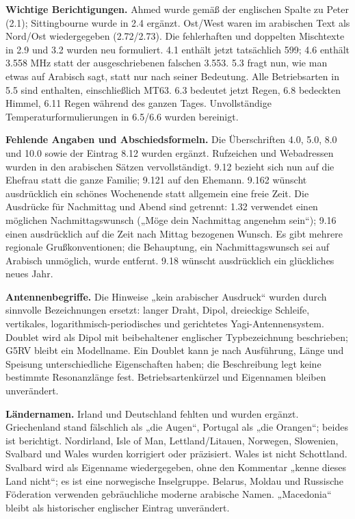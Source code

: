 \documentclass[a4paper,landscape,10pt]{article}
\begin{document}
\smallskip
\textbf{Wichtige Berichtigungen.} Ahmed wurde gemäß der englischen Spalte zu Peter (2.1);
Sittingbourne wurde in 2.4 ergänzt. Ost/West waren im arabischen Text als Nord/Ost wiedergegeben (2.72/2.73).
Die fehlerhaften und doppelten Mischtexte in 2.9 und 3.2 wurden neu formuliert.
4.1 enthält jetzt tatsächlich 599; 4.6 enthält 3.558 MHz statt der ausgeschriebenen falschen 3.553.
5.3 fragt nun, wie man etwas auf Arabisch sagt, statt nur nach seiner Bedeutung.
Alle Betriebsarten in 5.5 sind enthalten, einschließlich MT63.
6.3 bedeutet jetzt Regen, 6.8 bedeckten Himmel, 6.11 Regen während des ganzen Tages.
Unvollständige Temperaturformulierungen in 6.5/6.6 wurden bereinigt.

\smallskip
\textbf{Fehlende Angaben und Abschiedsformeln.} Die Überschriften 4.0, 5.0, 8.0 und 10.0 sowie der Eintrag
8.12 wurden ergänzt. Rufzeichen und Webadressen wurden in den arabischen Sätzen vervollständigt.
9.12 bezieht sich nun auf die Ehefrau statt die ganze Familie; 9.121 auf den Ehemann.
9.162 wünscht ausdrücklich ein schönes Wochenende statt allgemein eine freie Zeit.
Die Ausdrücke für Nachmittag und Abend sind getrennt: 1.32 verwendet einen möglichen Nachmittagswunsch
(„Möge dein Nachmittag angenehm sein“); 9.16 einen ausdrücklich auf die Zeit nach Mittag bezogenen Wunsch.
Es gibt mehrere regionale Grußkonventionen; die Behauptung, ein Nachmittagswunsch sei auf Arabisch unmöglich,
wurde entfernt. 9.18 wünscht ausdrücklich ein glückliches neues Jahr.

\smallskip
\textbf{Antennenbegriffe.} Die Hinweise „kein arabischer Ausdruck“ wurden durch sinnvolle Bezeichnungen ersetzt:
langer Draht, Dipol, dreieckige Schleife, vertikales, logarithmisch-periodisches und gerichtetes Yagi-Antennensystem.
Doublet wird als Dipol mit beibehaltener englischer Typbezeichnung beschrieben; G5RV bleibt ein Modellname.
Ein Doublet kann je nach Ausführung, Länge und Speisung unterschiedliche Eigenschaften haben;
die Beschreibung legt keine bestimmte Resonanzlänge fest. Betriebsartenkürzel und Eigennamen bleiben unverändert.

\smallskip
\textbf{Ländernamen.} Irland und Deutschland fehlten und wurden ergänzt.
Griechenland stand fälschlich als „die Augen“, Portugal als „die Orangen“; beides ist berichtigt.
Nordirland, Isle of Man, Lettland/Litauen, Norwegen, Slowenien, Svalbard und Wales wurden korrigiert oder präzisiert.
Wales ist nicht Schottland. Svalbard wird als Eigenname wiedergegeben, ohne den Kommentar „kenne dieses Land nicht“;
es ist eine norwegische Inselgruppe. Belarus, Moldau und Russische Föderation verwenden gebräuchliche moderne
arabische Namen. „Macedonia“ bleibt als historischer englischer Eintrag unverändert.
\end{document}
